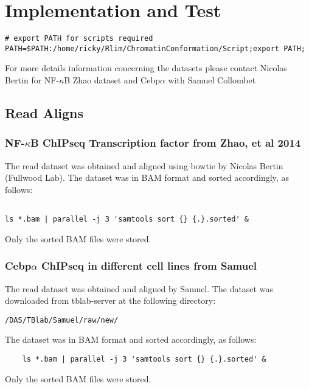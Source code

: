 \documentclass{article}\usepackage[]{graphicx}\usepackage[]{color}
\begin{document}
\section{Implementation and Test}

\begin{verbatim}
# export PATH for scripts required 
PATH=$PATH:/home/ricky/Rlim/ChromatinConformation/Script;export PATH;
\end{verbatim}

\small{For more details information concerning the datasets please contact Nicolas Bertin for NF-$\kappa$B Zhao dataset and Cebp$\alpha$ with Samuel Collombet}



\subsection{Read Aligns}

\subsubsection{NF-$\kappa$B ChIPseq Transcription factor from Zhao, et al 2014}
The read dataset was obtained and aligned using bowtie by Nicolas Bertin (Fullwood Lab).
The dataset was in BAM format and sorted accordingly, as follows: 

\begin{verbatim}

ls *.bam | parallel -j 3 'samtools sort {} {.}.sorted' & 

\end{verbatim}

Only the sorted BAM files were stored.


\subsubsection{Cebp$\alpha$ ChIPseq in different cell lines from Samuel}
The read dataset was obtained and aligned by Samuel.
The dataset was downloaded from tblab-server at the following directory:

\verb |/DAS/TBlab/Samuel/raw/new/| 

The dataset was in BAM format and sorted accordingly, as follows: 

\begin{verbatim}
    ls *.bam | parallel -j 3 'samtools sort {} {.}.sorted' & 
\end{verbatim}

Only the sorted BAM files were stored.
\end{document}

